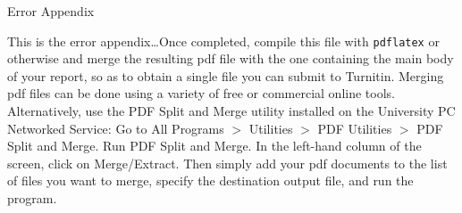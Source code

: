 \documentclass[twocolumn]{revtex4}
\begin{document}
\textheight=24.75cm

\begin{center}
{\large Error Appendix}\\
\end{center}


This is the error appendix\ldots Once completed, compile this file with
{\tt pdflatex} or otherwise 
and merge the resulting pdf file  with the one containing the
main body of your report, so as to obtain a single file you can submit
to Turnitin. Merging pdf files can be done using a variety of free
or commercial online tools. Alternatively, use the PDF Split and Merge
utility installed on the
University PC Networked Service: Go to All Programs $>$ Utilities $>$
PDF Utilities $>$ PDF Split and Merge. Run PDF Split and Merge. In the left-hand column of the screen, click on Merge/Extract. Then simply add
your pdf documents to the list of files you want to merge, specify the destination output file, and run the program.

\clearpage %
\end{document}
